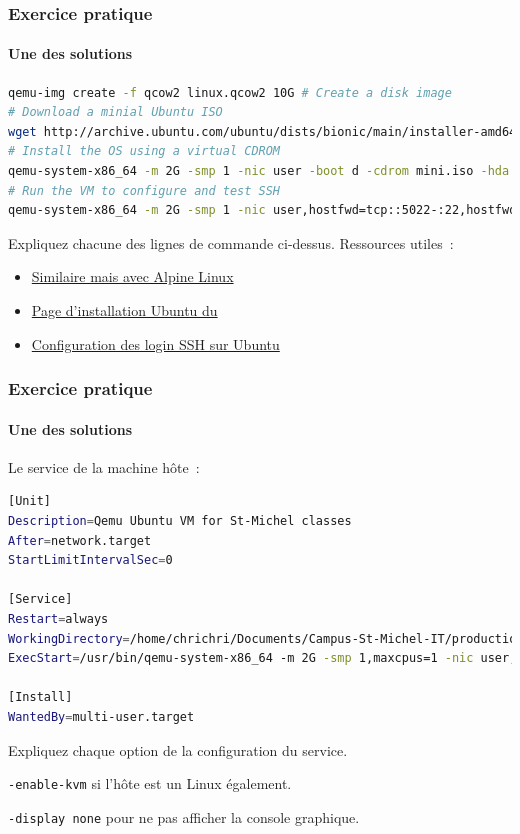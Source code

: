 \documentclass{beamer}
\begin{document}
    \begin{frame}[fragile]
        \transdissolve
        \frametitle{Exercice pratique}
        \framesubtitle{Une des solutions}
        \begin{lstlisting}[language=bash]
qemu-img create -f qcow2 linux.qcow2 10G # Create a disk image
# Download a minial Ubuntu ISO
wget http://archive.ubuntu.com/ubuntu/dists/bionic/main/installer-amd64/current/images/netboot/mini.iso
# Install the OS using a virtual CDROM
qemu-system-x86_64 -m 2G -smp 1 -nic user -boot d -cdrom mini.iso -hda linux.qcow2 -k fr -enable-kvm
# Run the VM to configure and test SSH
qemu-system-x86_64 -m 2G -smp 1 -nic user,hostfwd=tcp::5022-:22,hostfwd=tcp::5080-:80 -display none -hda linux.qcow2 -k fr -enable-kvm
        \end{lstlisting}
        Expliquez chacune des lignes de commande ci-dessus.
        \bigbreak
        Ressources utiles~:
        \begin{itemize}
            \item \href{https://wiki.alpinelinux.org/wiki/Install_Alpine_in_QEMU}{Similaire mais avec Alpine Linux}
            \item \href{https://help.ubuntu.com/community/Installation/MinimalCD\#A64-bit_PC_.28amd64.2C_x86_64.29_.28Recommended.29}{Page d'installation Ubuntu du  }
            \item \href{https://phoenixnap.com/kb/generate-setup-ssh-key-ubuntu}{Configuration des login SSH sur Ubuntu}
        \end{itemize}
    \end{frame}

    \begin{frame}[fragile]
        \transdissolve
        \frametitle{Exercice pratique}
        \framesubtitle{Une des solutions}
        Le service de la machine hôte~:
        \begin{lstlisting}[language=bash]
[Unit]
Description=Qemu Ubuntu VM for St-Michel classes
After=network.target
StartLimitIntervalSec=0

[Service]
Restart=always
WorkingDirectory=/home/chrichri/Documents/Campus-St-Michel-IT/production-deployment
ExecStart=/usr/bin/qemu-system-x86_64 -m 2G -smp 1,maxcpus=1 -nic user,hostfwd=tcp::5022-:22,hostfwd=tcp::5080-:8080 -display none -hda linux.qcow2 -k fr -enable-kvm

[Install]
WantedBy=multi-user.target
        \end{lstlisting}
        Expliquez chaque option de la configuration du service.
        \pause
        \begin{dangercolorbox}
            \lstinline{-enable-kvm} si l'hôte est un Linux également.

            \lstinline{-display none} pour ne pas afficher la console graphique.
        \end{dangercolorbox}
    \end{frame}
\end{document}
